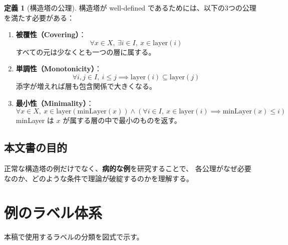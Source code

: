 \documentclass[a4paper,11pt]{ltjsarticle}
\theoremstyle{definition}
\newtheorem{definition}{定義}[section]
\theoremstyle{plain}
\theoremstyle{remark}
\newcommand{\Layer}{\mathrm{layer}}
\newcommand{\minLayer}{\mathrm{minLayer}}
\begin{document}
\begin{definition}[構造塔の公理]
構造塔が well-defined であるためには、以下の3つの公理を満たす必要がある：

\begin{enumerate}
    \item \textbf{被覆性（Covering）}：
    \[
        \forall x \in X,\ \exists i \in I,\ x \in \Layer(i)
    \]
    すべての元は少なくとも一つの層に属する。
    
    \item \textbf{単調性（Monotonicity）}：
    \[
        \forall i, j \in I,\ i \leq j \implies \Layer(i) \subseteq \Layer(j)
    \]
    添字が増えれば層も包含関係で大きくなる。
    
    \item \textbf{最小性（Minimality）}：
    \[
        \forall x \in X,\ x \in \Layer(\minLayer(x)) \land 
        \left( \forall i \in I,\ x \in \Layer(i) \implies \minLayer(x) \leq i \right)
    \]
    minLayer は $x$ が属する層の中で最小のものを返す。
\end{enumerate}
\end{definition}

\subsection{本文書の目的}

正常な構造塔の例だけでなく、\textbf{病的な例}を研究することで、
各公理がなぜ必要なのか、どのような条件で理論が破綻するのかを理解する。

\section{例のラベル体系}

本稿で使用するラベルの分類を図式で示す。
\end{document}
